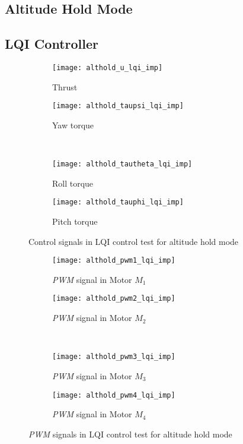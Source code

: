 \begin{appendices}
\section*{Altitude Hold Mode}
\subsection*{LQI Controller}
\begin{figure}[H]
\begin{subfigure}{.5\linewidth}
\centering
\texttt{[image: althold\_u\_lqi\_imp]}
\caption{Thrust}
\label{fig:althold_u_lqi_imp}
\end{subfigure}%
\begin{subfigure}{.5\linewidth}
\centering
\texttt{[image: althold\_taupsi\_lqi\_imp]}
\caption{Yaw torque}
\label{fig:althold_taupsi_lqi_imp}
\end{subfigure}\\[1ex]
\begin{subfigure}{0.5\linewidth}
\centering
\texttt{[image: althold\_tautheta\_lqi\_imp]}
\caption{Roll torque}
\label{fig:althold_tautheta_lqi_imp}
\end{subfigure}
\begin{subfigure}{0.5\linewidth}
\centering
\texttt{[image: althold\_tauphi\_lqi\_imp]}
\caption{Pitch torque}
\label{fig:althold_tauphi_lqi_imp}
\end{subfigure}
\caption{Control signals in LQI control test for altitude hold mode}
\label{fig:althold_control_lqi}
\end{figure}

\begin{figure}[H]
\begin{subfigure}{.5\linewidth}
\centering
\texttt{[image: althold\_pwm1\_lqi\_imp]}
\caption{\textit{PWM} signal in Motor $M_1$}
\label{fig:althold_pwm_lqi_imp}
\end{subfigure}%
\begin{subfigure}{.5\linewidth}
\centering
\texttt{[image: althold\_pwm2\_lqi\_imp]}
\caption{\textit{PWM} signal in Motor $M_2$}
\label{fig:althold_pwm2_lqi_imp}
\end{subfigure}\\[1ex]
\begin{subfigure}{0.5\linewidth}
\centering
\texttt{[image: althold\_pwm3\_lqi\_imp]}
\caption{\textit{PWM} signal in Motor $M_3$}
\label{fig:althold_pwm3_lqi_imp}
\end{subfigure}
\begin{subfigure}{0.5\linewidth}
\centering
\texttt{[image: althold\_pwm4\_lqi\_imp]}
\caption{\textit{PWM} signal in Motor $M_4$}
\label{fig:althold_pwm4_lqi_imp}
\end{subfigure}
\caption{\textit{PWM} signals in LQI control test for altitude hold mode}
\label{fig:althold_pwm_lqi}
\end{figure}


\end{appendices}
